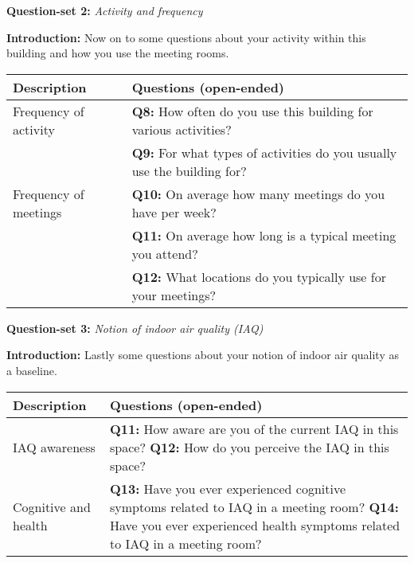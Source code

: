 \begin{appendices}
\vspace{-10pt}

\begin{table}[htbp]
    \captionsetup{justification=raggedright,singlelinecheck=false}
    \raggedright \textbf{Question-set 2:} \textit{Activity and frequency} \\
    \label{tab:column_widths}
    \raggedright \textbf{Introduction:} Now on to some questions about your activity within this building and how you use the meeting rooms.
    \begin{tabularx}{\textwidth}{|p{}|X|}
        \hline
        \textbf{Description} & \textbf{Questions (open-ended)} \\
        \hline
        Frequency of activity & \textbf{Q8:} How often do you use this building for various activities? \\
        & \textbf{Q9:} For what types of activities do you usually use the building for? \\
        \hline
        Frequency of meetings & \textbf{Q10:} On average how many meetings do you have per week? \\
        & \textbf{Q11:} On average how long is a typical meeting you attend? \\
        & \textbf{Q12:} What locations do you typically use for your meetings? \\
        \hline
    \end{tabularx}
\end{table}

\vspace{-10pt}

\begin{table}[htbp]
    \captionsetup{justification=raggedright,singlelinecheck=false}
    \raggedright \textbf{Question-set 3:} \textit{Notion of indoor air quality (IAQ)} \\
    \label{tab:column_widths}
    \raggedright \textbf{Introduction:} Lastly some questions about your notion of indoor air quality as a baseline.
    \begin{tabularx}{\textwidth}{|p{}|X|}
        \hline
        \textbf{Description} & \textbf{Questions (open-ended)} \\
        \hline
        IAQ awareness & \textbf{Q11:} How aware are you of the current IAQ in this space? 
        \newline
        \textbf{Q12:} How do you perceive the IAQ in this space? \\
        \hline
        Cognitive and health & \textbf{Q13:} Have you ever experienced cognitive symptoms related to IAQ in a meeting room? 
        \newline
        \textbf{Q14:} Have you ever experienced health symptoms related to IAQ in a meeting room?  \\
        \hline
    \end{tabularx}
\end{table}


\end{appendices}
